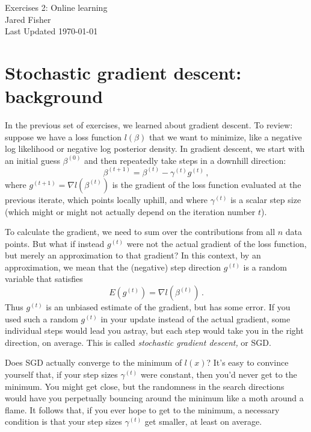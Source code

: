 \documentclass{article}
\begin{document}
\large 
\begin{center}
Exercises 2: Online learning \\
\vspace{10pt}
Jared Fisher\\
Last Updated \today
\end{center}
\normalsize

\section{Stochastic gradient descent: background}

In the previous set of exercises, we learned about gradient descent.  To review: suppose we have a loss function $l(\beta)$ that we want to minimize, like a negative log likelihood or negative log posterior density.  In gradient descent, we start with an initial guess $\beta^{(0)}$ and then repeatedly take steps in a downhill direction:
$$
\beta^{(t+1)} = \beta^{(t)} - \gamma^{(t)} g^{(t)} \, ,
$$
where $g^{(t+1)}  = \nabla l(\beta^{(t)})$ is the gradient of the loss function evaluated at the previous iterate, which points locally uphill, and where $ \gamma^{(t)}$ is a scalar step size (which might or might not actually depend on the iteration number $t$).

To calculate the gradient, we need to sum over the contributions from all $n$ data points.  But what if instead $g^{(t)}$ were not the actual gradient of the loss function, but merely an approximation to that gradient?  In this context, by an approximation, we mean that the (negative) step direction $g^{(t)}$ is a random variable that satisfies
$$
E(g^{(t)}) = \nabla l(\beta^{(t)}) \, .
$$
Thus $g^{(t)}$ is an unbiased estimate of the gradient, but has some error.   If you used such a random $g^{(t)}$ in your update instead of the actual gradient, some individual steps would lead you astray, but each step would take you in the right direction, on average.  This is called \textit{stochastic gradient descent,} or SGD. 

Does SGD actually converge to the minimum of $l(x)$?  It's easy to convince yourself that, if your step sizes $\gamma^{(t)}$ were constant, then you'd never get to the minimum.  You might get close, but the randomness in the search directions would have you perpetually bouncing around the minimum like a moth around a flame.  It follows that, if you ever hope to get to the minimum, a necessary condition is that your step sizes $\gamma^{(t)}$ get smaller, at least on average.
\end{document}

